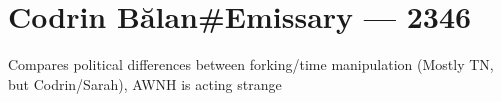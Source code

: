 \hypertarget{codrin-bux103lanemissary-2346}{%
\chapter{Codrin Bălan\#Emissary — 2346}\label{codrin-bux103lanemissary-2346}}

Compares political differences between forking/time manipulation (Mostly TN, but Codrin/Sarah), AWNH is acting strange
